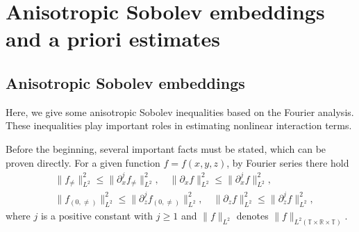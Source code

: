 \documentclass[12pt, reqno]{amsart}
\newtheorem{remark}{Remark}[section]
\numberwithin{equation}{section}
\begin{document}
	
	
	\section{Anisotropic Sobolev embeddings and a priori estimates}\label{sec_estimate_1}
	
	\subsection{Anisotropic Sobolev embeddings}
	Here, we give some anisotropic Sobolev inequalities based on the Fourier analysis. These inequalities play important roles in estimating nonlinear interaction terms.
	
	Before the beginning, several important facts must be stated, which can be  proven directly.
	For a given function $f=f(x,y,z)$, by Fourier series there hold
	\begin{equation}\label{eq:fourier ine}
		\begin{aligned}
			&\|f_{\neq}\|^2_{L^2}\leq \|\partial_x^jf_{\neq}\|^2_{L^2},\quad
			\|\partial_xf\|^2_{L^2}\leq \|\partial_x^jf\|^2_{L^2},\\
			&\|f_{(0,\neq)}\|^2_{L^2}\leq \|\partial_z^jf_{(0,\neq)}\|^2_{L^2},\quad
			\|\partial_zf\|^2_{L^2}\leq \|\partial_z^jf\|^2_{L^2},
		\end{aligned}
	\end{equation}
	where $j$ is a positive constant with $j\geq1$ and $\|f\|_{L^2}$ denotes $\|f\|_{L^2(\mathbb{T}\times\mathbb{R}\times\mathbb{T})}$. 
	
\end{document}
